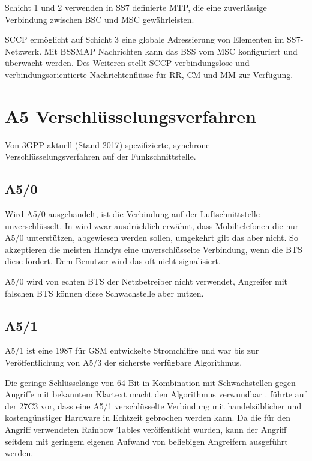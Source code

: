 Schicht 1 und 2 verwenden in \ac{SS7} definierte \ac{MTP}, die eine zuverlässige Verbindung zwischen \ac{BSC} und \ac{MSC} gewährleisten.

\ac{SCCP} ermöglicht auf Schicht 3 eine globale Adressierung von Elementen im \ac{SS7}-Netzwerk. Mit \ac{BSSMAP} Nachrichten kann das \ac{BSS} vom \ac{MSC} konfiguriert und überwacht werden. Des Weiteren stellt \ac{SCCP} verbindungslose und verbindungsorientierte Nachrichtenflüsse für \acf{RR}, \ac{CM} und \ac{MM} zur Verfügung.

\section{A5 Verschlüsselungsverfahren}\label{hdl:a_a5}
Von \ac{3GPP} aktuell (Stand 2017) spezifizierte, synchrone Verschlüsselungsverfahren auf der Funkschnittstelle.

\subsection{A5/0}
Wird A5/0 ausgehandelt, ist die Verbindung auf der Luftschnittstelle unverschlüsselt. In  wird zwar ausdrücklich erwähnt, dass Mobiltelefonen die nur A5/0 unterstützen, abgewiesen werden sollen, umgekehrt gilt das aber nicht. So akzeptieren die meisten Handys eine unverschlüsselte Verbindung, wenn die \ac{BTS} diese fordert. Dem Benutzer wird das oft nicht signalisiert. 

A5/0 wird von echten \ac{BTS} der Netzbetreiber nicht verwendet, Angreifer mit falschen \ac{BTS} können diese Schwachstelle aber nutzen.

\subsection{A5/1}

A5/1 ist eine 1987 für \ac{GSM} entwickelte Stromchiffre und war bis zur Veröffentlichung von A5/3 der sicherste verfügbare Algorithmus.

Die geringe Schlüsselänge von 64 Bit in Kombination mit Schwachstellen gegen Angriffe mit bekanntem Klartext macht den Algorithmus verwundbar \citep{golic1997cryptanalysis}. \citet{nohl2010wideband} führte auf der 27C3 vor, dass eine A5/1 verschlüsselte Verbindung mit handelsüblicher und kostengünstiger Hardware in Echtzeit gebrochen werden kann. Da die für den Angriff verwendeten Rainbow Tables veröffentlicht wurden, kann der Angriff seitdem mit geringem eigenen Aufwand von beliebigen Angreifern ausgeführt werden.

